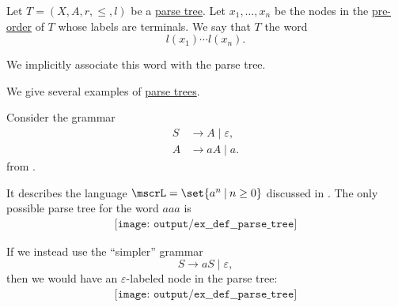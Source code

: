 \begin{definition}\label{def:parse_tree_word}\mimprovised
  Let \( T = (X, A, r, \leq, l) \) be a \hyperref[def:parse_tree]{parse tree}. Let \( x_1, \ldots, x_n \) be the nodes in the \hyperref[def:traversal_ordering]{pre-order} of \( T \) whose labels are terminals. We say that \( T \)  the word
  \begin{equation*}
    l(x_1) \cdots l(x_n).
  \end{equation*}

  We implicitly associate this word with the parse tree.
\end{definition}

\begin{example}\label{ex:def:parse_tree}
  We give several examples of \hyperref[def:parse_tree]{parse trees}.

  \begin{thmenum}
     Consider the grammar
    \begin{equation*}
      \begin{aligned}
        S &\to A \mid \varepsilon, \\
        A &\to aA \mid a.
      \end{aligned}
    \end{equation*}
    from .

    It describes the language \( \mscrL = \set{ a^n \given n \geq 0 } \) discussed in . The only possible parse tree for the word \( aaa \) is
    \begin{equation*}\label{eq:ex:def:parse_tree/an}
      \begin{aligned}
        \texttt{[image: output/ex\_\_def\_\_parse\_tree]}
      \end{aligned}
    \end{equation*}

    If we instead use the \enquote{simpler} grammar
    \begin{equation*}
      S \to aS \mid \varepsilon,
    \end{equation*}
    then we would have an \( \varepsilon \)-labeled node in the parse tree:
    \begin{equation*}
      \begin{aligned}
        \texttt{[image: output/ex\_\_def\_\_parse\_tree]}
      \end{aligned}
    \end{equation*}


\end{thmenum}
\end{example}
